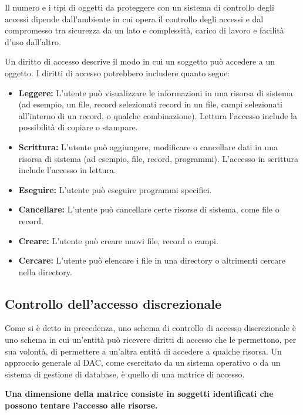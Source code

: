 \singlespacing

Il numero e i tipi di oggetti da proteggere con un sistema di controllo degli accessi dipende dall'ambiente in cui opera il controllo degli accessi e dal compromesso tra sicurezza da un lato e complessità, carico di lavoro e facilità d'uso dall'altro.

\singlespacing

Un diritto di accesso descrive il modo in cui un soggetto può accedere a un oggetto. I diritti di accesso potrebbero includere quanto segue:
\begin{itemize}
    \item \textbf{Leggere:} L'utente può visualizzare le informazioni in una risorsa di sistema (ad esempio, un file, record selezionati record in un file, campi selezionati all'interno di un record, o qualche combinazione). Lettura l'accesso include la possibilità di copiare o stampare.
    
    \item \textbf{Scrittura:} L'utente può aggiungere, modificare o cancellare dati in una risorsa di sistema (ad esempio, file, record, programmi). L'accesso in scrittura include l'accesso in lettura.
    
    \item \textbf{Eseguire:} L'utente può eseguire programmi specifici.
    
    \item \textbf{Cancellare:} L'utente può cancellare certe risorse di sistema, come file o record.
    
    \item \textbf{Creare:} L'utente può creare nuovi file, record o campi.
    
    \item \textbf{Cercare:} L'utente può elencare i file in una directory o altrimenti cercare nella directory.
\end{itemize}
\subsection{Controllo dell'accesso discrezionale}
Come si è detto in precedenza, uno schema di controllo di accesso discrezionale è uno schema in cui un'entità può ricevere diritti di accesso che le permettono, per sua volontà, di permettere a un'altra entità di accedere a qualche risorsa. Un approccio generale al DAC, come esercitato da un sistema operativo o da un sistema di gestione di database, è quello di una matrice di accesso.
\begin{center}
    \textbf{Una dimensione della matrice consiste in soggetti identificati che possono tentare l'accesso alle risorse.}
\end{center}

